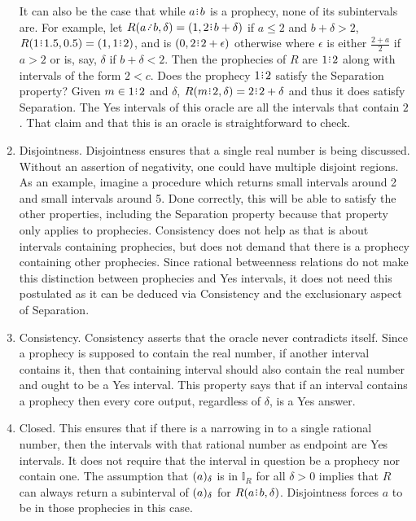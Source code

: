\documentclass[12pt]{article}
\begin{document}
\begin{enumerate}
    It can also be the case that while $a\rint b$ is a prophecy, none of its subintervals are. For example, let $R(a \lte  b, \delta) = (1, 2\rint  b+ \delta)$ if $a \leq 2$ and $b + \delta > 2$,  $R(1\rint 1.5, 0.5) = (1, 1\rint 2)$, and is $(0, 2\rint 2+\epsilon)$ otherwise where $\epsilon$ is either $\frac{2+a}{2}$ if $a > 2$ or is, say, $\delta$ if $b+\delta < 2$. Then the prophecies of $R$ are  $1\rint 2$ along with intervals of the form $2 \lt  c$. Does the prophecy $1\rint 2$ satisfy the Separation property? Given $m \in 1\rint 2$ and $\delta$, $R(m \rint 2, \delta) = 2\rint 2+\delta$ and thus it does satisfy Separation. The Yes intervals of this oracle are all the intervals that contain $2$. That claim and that this is an oracle is straightforward to check.  
    
 
    \item Disjointness. Disjointness ensures that a single real number is being discussed. Without an assertion of negativity, one could have multiple disjoint regions.  As an example, imagine a procedure which returns small intervals around 2 and small intervals around 5. Done correctly, this will be able to satisfy the other properties, including the Separation property because that property only applies to prophecies. Consistency does not help as that is about intervals containing prophecies, but does not demand that there is a prophecy containing other prophecies.  Since rational betweenness relations do not make this distinction between prophecies and Yes intervals, it does not need this postulated as it can be deduced via Consistency and the exclusionary aspect of Separation. 
    
    \item Consistency. Consistency asserts that the oracle never contradicts itself. Since a prophecy is supposed to contain the real number, if another interval contains it, then that containing interval should also contain the real number and ought to be a Yes interval. This property says that if an interval contains a prophecy then every core output, regardless of $\delta$, is a Yes answer. 

    
    \item Closed. This ensures that if there is a narrowing in to a single rational number, then the intervals with that rational number as endpoint are Yes intervals. It does not require that the interval in question be a prophecy nor contain one. The assumption that $(a)_{\delta}$ is in $\mathbb{I}_R$ for all $\delta >0$ implies that $R$ can always return a subinterval of $(a)_{\delta}$ for $R(a\rint b, \delta)$. Disjointness forces $a$ to be in those prophecies in this case. 



\end{enumerate}
\end{document}
